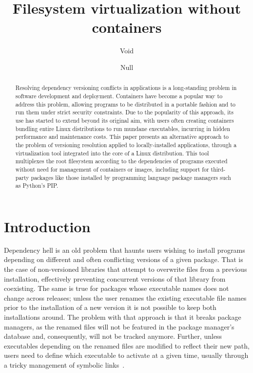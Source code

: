 \documentclass[sigplan, anonymous, 10pt]{acmart}
\begin{document}
\title{Filesystem virtualization without containers}

\author{Void}

\author{Null}

\renewcommand{\shortauthors}{Void et al.}

\begin{abstract}
Resolving dependency versioning conflicts in applications is a long-standing problem in
software development and deployment. Containers have become a popular way to address this
problem, allowing programs to be distributed in a portable fashion and to run them under strict
security constraints. Due to the popularity of this approach, its use has started to extend
beyond its original aim, with users often creating containers bundling entire Linux distributions
to run mundane executables, incurring in hidden performance and maintenance costs.
This paper presents an alternative approach to the problem of versioning resolution applied
to locally-installed applications, through a virtualization tool integrated into the core
of a Linux distribution. This tool multiplexes the root filesystem according to the
dependencies of programs executed without need for management of containers or images,
including support for third-party packages like those installed by programming language
package managers such as Python's PIP.
\end{abstract}

\maketitle

\section{Introduction}
Dependency hell is an old problem that haunts users wishing to install programs depending on
different and often conflicting versions of a given package. That is the case of non-versioned
libraries that attempt to overwrite files from a previous installation, effectively preventing
concurrent versions of that library from coexisting. The same is true for packages whose executable
names does not change across releases; unless the user renames the existing executable file names
prior to the installation of a new version it is not possible to keep both installations around.
The problem with that approach is that it breaks package managers, as the renamed files will not
be featured in the package manager's database and, consequently, will not be tracked anymore. Further, 
unless executables depending on the renamed files are modified to reflect their new path, users need
to define which executable to activate at a given time, usually through a tricky management of
symbolic links~\cite{RHEL?}.
\end{document}
